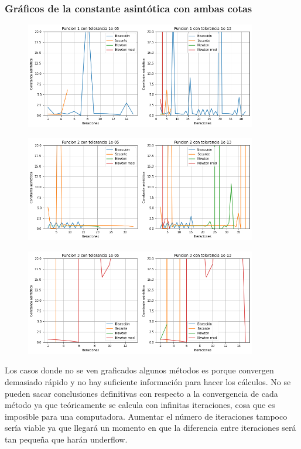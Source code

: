 \documentclass[titlepage,a4paper]{article}
\begin{document}
\subsubsection{Gráficos de la constante asintótica con ambas cotas}
\begin{figure}[H]
  \centering
    \includegraphics[width=0.9\textwidth]{asinf1.png}
\end{figure}
\begin{figure}[H]
  \centering
    \includegraphics[width=0.9\textwidth]{asinf2.png}
\end{figure}
\begin{figure}[H]
  \centering
    \includegraphics[width=0.9\textwidth]{asinf3.png}
\end{figure}

\newpage
Los casos donde no se ven graficados algunos métodos es porque convergen demasiado rápido y no hay suficiente información para hacer los cálculos.
No se pueden sacar conclusiones definitivas con respecto a la convergencia de cada método ya que teóricamente se calcula con infinitas iteraciones, cosa que es imposible para una computadora. Aumentar el número de iteraciones tampoco sería viable ya que llegará un momento en que la diferencia entre iteraciones será tan pequeña que harán underflow.
\end{document}
